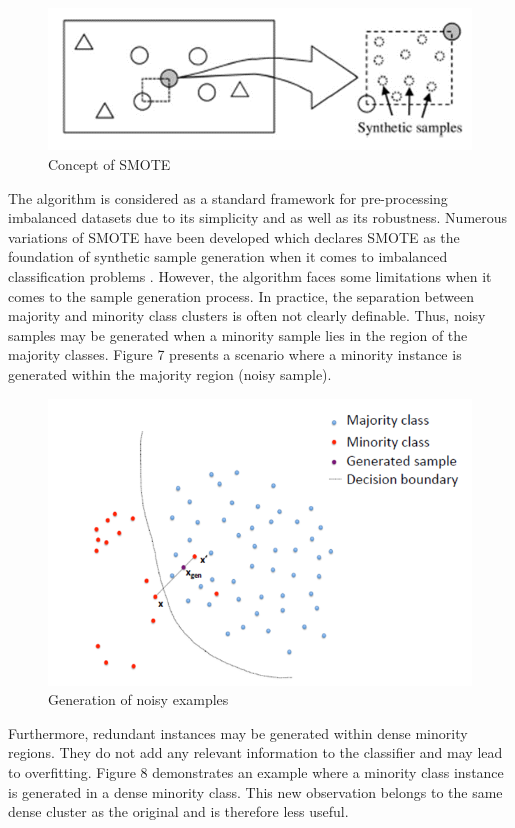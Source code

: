 \documentclass[parskip=full]{scrartcl}
\begin{document}
\begin{figure}[H]
	\centering
	\includegraphics[width=0.5\linewidth]{./Resources/smote}
	\caption{Concept of SMOTE}
	\label{fig:smote}
\end{figure}

The algorithm is considered as a standard framework for pre-processing
imbalanced datasets due to its simplicity and as well as its robustness.
Numerous variations of SMOTE have been developed which declares SMOTE as the
foundation of synthetic sample generation when it comes to imbalanced
classification problems \cite{Fernandez.2018}. However, the algorithm faces some
limitations when it comes to the sample generation process. In practice, the
separation between majority and minority class clusters is often not clearly
definable. Thus, noisy samples may be generated when a minority sample lies in
the region of the majority classes. Figure 7 presents a scenario where a
minority instance is generated within the majority region (noisy sample).

\begin{figure}[H]
	\centering
	\includegraphics[width=0.6\linewidth]{"./resources/noisy_examples"}
	\caption{Generation of noisy examples}
	\label{fig:noisy-examples}
\end{figure}

Furthermore, redundant instances may be generated within dense minority regions.
They do not add any relevant information to the classifier and may lead to
overfitting. Figure 8 demonstrates an example where a minority class instance is
generated in a dense minority class. This new observation belongs to the same
dense cluster as the original and is therefore less useful. 
\end{document}
